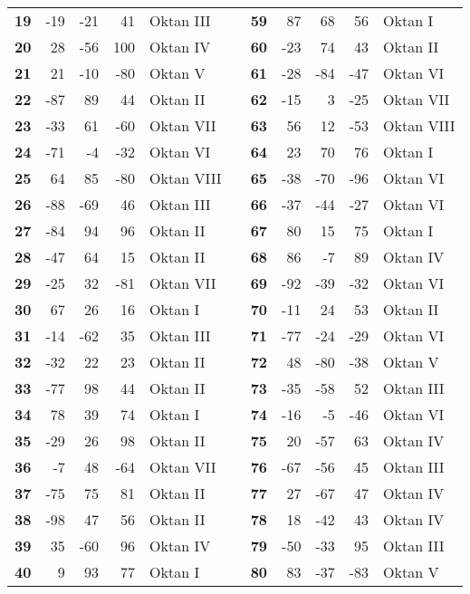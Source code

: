 \begin{longtable}[c]{rrrrlcrrrrl}
\textbf{19} & -19   & -21   & 41    & Oktan III &       & \textbf{59} & 87    & 68    & 56    & Oktan I \\
\textbf{20} & 28    & -56   & 100   & Oktan IV &       & \textbf{60} & -23   & 74    & 43    & Oktan II \\
\textbf{21} & 21    & -10   & -80   & Oktan V &       & \textbf{61} & -28   & -84   & -47   & Oktan VI \\
\textbf{22} & -87   & 89    & 44    & Oktan II &       & \textbf{62} & -15   & 3     & -25   & Oktan VII \\
\textbf{23} & -33   & 61    & -60   & Oktan VII &       & \textbf{63} & 56    & 12    & -53   & Oktan VIII \\
\textbf{24} & -71   & -4    & -32   & Oktan VI &       & \textbf{64} & 23    & 70    & 76    & Oktan I \\
\textbf{25} & 64    & 85    & -80   & Oktan VIII &       & \textbf{65} & -38   & -70   & -96   & Oktan VI \\
\textbf{26} & -88   & -69   & 46    & Oktan III &       & \textbf{66} & -37   & -44   & -27   & Oktan VI \\
\textbf{27} & -84   & 94    & 96    & Oktan II &       & \textbf{67} & 80    & 15    & 75    & Oktan I \\
\textbf{28} & -47   & 64    & 15    & Oktan II &       & \textbf{68} & 86    & -7    & 89    & Oktan IV \\
\textbf{29} & -25   & 32    & -81   & Oktan VII &       & \textbf{69} & -92   & -39   & -32   & Oktan VI \\
\textbf{30} & 67    & 26    & 16    & Oktan I &       & \textbf{70} & -11   & 24    & 53    & Oktan II \\
\textbf{31} & -14   & -62   & 35    & Oktan III &       & \textbf{71} & -77   & -24   & -29   & Oktan VI \\
\textbf{32} & -32   & 22    & 23    & Oktan II &       & \textbf{72} & 48    & -80   & -38   & Oktan V \\
\textbf{33} & -77   & 98    & 44    & Oktan II &       & \textbf{73} & -35   & -58   & 52    & Oktan III \\
\textbf{34} & 78    & 39    & 74    & Oktan I &       & \textbf{74} & -16   & -5    & -46   & Oktan VI \\
\textbf{35} & -29   & 26    & 98    & Oktan II &       & \textbf{75} & 20    & -57   & 63    & Oktan IV \\
\textbf{36} & -7    & 48    & -64   & Oktan VII &       & \textbf{76} & -67   & -56   & 45    & Oktan III \\
\textbf{37} & -75   & 75    & 81    & Oktan II &       & \textbf{77} & 27    & -67   & 47    & Oktan IV \\
\textbf{38} & -98   & 47    & 56    & Oktan II &       & \textbf{78} & 18    & -42   & 43    & Oktan IV \\
\textbf{39} & 35    & -60   & 96    & Oktan IV &       & \textbf{79} & -50   & -33   & 95    & Oktan III \\
\textbf{40} & 9     & 93    & 77    & Oktan I &       & \textbf{80} & 83    & -37   & -83   & Oktan V \\
\end{longtable}
